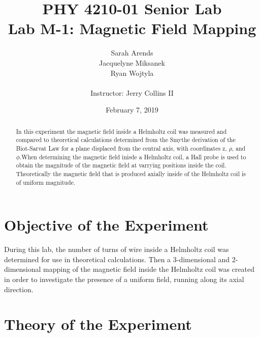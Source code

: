 \documentclass[a4paper]{article}
\title{PHY 4210-01 Senior Lab \\Lab M-1: Magnetic Field Mapping}
\author{Sarah Arends \\ 
        Jacquelyne Miksanek \\
        Ryan Wojtyla \\ \\
        Instructor: Jerry Collins II}
\date{February 7, 2019}
\begin{document}
\maketitle 

\begin{abstract}
In this experiment the magnetic field inside a Helmholtz coil was measured and compared to theoretical calculations determined from the Smythe derivation of the Biot-Sarvat Law for a plane displaced from the central axis, with coordinates z, $\rho$, and $\phi$.When determining the magnetic field inisde a Helmholtz coil, a Hall probe is used to obtain the magnitude of the magnetic field at varrying positions inside the coil. Theoretically the magnetic field that is produced axially inside of the Helmholtz coil is of uniform magnitude.    
\end{abstract}

\newpage

\tableofcontents

\newpage

\section{Objective of the Experiment}
During this lab, the number of turns of wire inside a Helmholtz coil was determined for use in theoretical calculations. Then a 3-dimensional and 2-dimensional mapping of the magnetic field inside the Helmholtz coil was created in order to investigate the presence of a uniform field, running along its axial direction.

\section{Theory of the Experiment}
\end{document}
